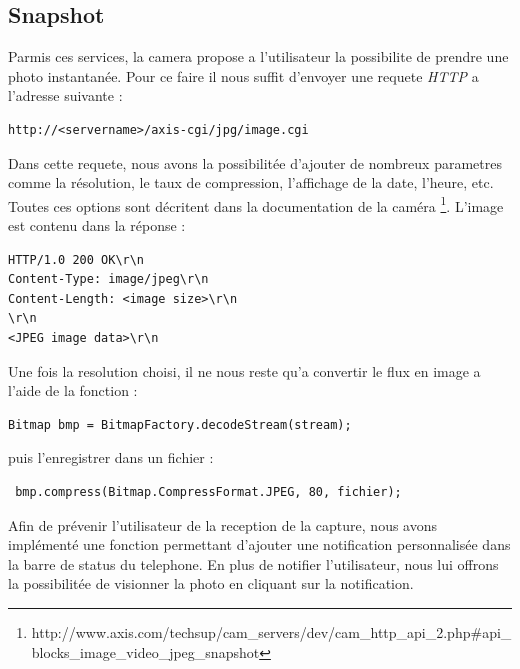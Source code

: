 \subsection{Snapshot}
Parmis ces services, la camera propose a l'utilisateur la possibilite de
prendre une photo instantanée. \newline
Pour ce faire il nous suffit d'envoyer une requete \textit{HTTP} a l'adresse
suivante : 
\begin{lstlisting}
http://<servername>/axis-cgi/jpg/image.cgi
\end{lstlisting}
Dans cette requete, nous avons la possibilitée d'ajouter de nombreux parametres
comme la résolution, le taux de compression, l'affichage de la date, l'heure,
etc. Toutes ces options sont décritent dans la documentation de la caméra
\footnote{\label{MjpegView}http://www.axis.com/techsup/cam\_servers/dev/cam\_http\_api\_2.php\#api\_blocks\_image\_video\_jpeg\_snapshot}.
L'image est contenu dans la réponse :
\begin{lstlisting}
HTTP/1.0 200 OK\r\n
Content-Type: image/jpeg\r\n
Content-Length: <image size>\r\n
\r\n
<JPEG image data>\r\n
\end{lstlisting}
Une fois la resolution choisi, il ne nous reste qu'a convertir le flux en image
a l'aide de la fonction :
\begin{lstlisting}
Bitmap bmp = BitmapFactory.decodeStream(stream);
\end{lstlisting}
puis l'enregistrer dans un fichier :
\begin{lstlisting}
 bmp.compress(Bitmap.CompressFormat.JPEG, 80, fichier);
\end{lstlisting}
Afin de prévenir l'utilisateur de la reception de la capture, nous avons
implémenté une fonction permettant d'ajouter une notification personnalisée dans
la barre de status du telephone.\newline
En plus de notifier l'utilisateur, nous lui offrons la possibilitée de visionner
la photo en cliquant sur la notification.
